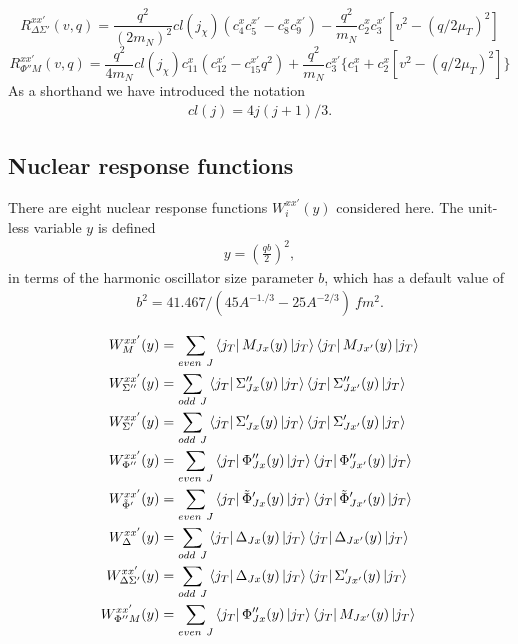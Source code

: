 \documentclass[
14pt, %
a4paper, %
oneside, %
headinclude,footinclude, %
BCOR5mm, %
]{scrartcl}
\begin{document}
\begin{dmath}
R_{\Delta \Sigma'}^{xx'}(v,q) = \frac{q^2}{(2m_N)^2}cl(j_\chi) 
        (c_{4}^{x}c_{5}^{x'} - c_{8}^{x}c_{9}^{x'}) 
        - \frac{q^2}{m_N} c_{2}^{x}c_{3}^{x'} [v^2-(q/2\mu_T)^2]
\end{dmath}
\begin{dmath}
R_{\Phi''M}^{xx'}(v,q) = \frac{q^2}{4m_N}cl(j_\chi)c_{11}^{x}
        (c_{12}^{x'} - c_{15}^{x'} q^2) 
        + \frac{q^2}{m_N}c_{3}^{x'}  \{c_{1}^{x} + c_{2}^{x} [v^2-(q/2\mu_T)^2]\}
\end{dmath}
As a shorthand we have introduced the notation 
\begin{align}
	cl(j) = 4j(j+1)/3.
\end{align}


\subsection{Nuclear response functions}
There are eight nuclear response functions $W_i^{xx'}(y)$ considered 
here. The unit-less variable $y$ is defined 
\begin{align}
 y = \left ( \frac{qb}{2} \right) ^2,
 \end{align}
 in terms of the harmonic oscillator size parameter $b$, which has a default value of 
 \begin{align}\label{bho}
b^2 = 41.467/(45A^{-1./3} - 25A^{-2/3})\ fm^2.
 \end{align}

 
\begin{align}
W_M^{xx'}(y) &= \sum_{even\ J} 
\bra{j_T}M_{Jx}(y)\ket{j_T}
\bra{j_T}M_{Jx'}(y)\ket{j_T}
\\
W_{\Sigma''}^{xx'}(y) &= \sum_{odd\ J} 
\bra{j_T}{\Sigma''}_{Jx}(y)\ket{j_T}
\bra{j_T}{\Sigma''}_{Jx'}(y)\ket{j_T}
\\
W_{\Sigma'}^{xx'}(y) &= \sum_{odd\ J} 
\bra{j_T}{\Sigma'}_{Jx}(y)\ket{j_T}
\bra{j_T}{\Sigma'}_{Jx'}(y)\ket{j_T}
\\
W_{\Phi''}^{xx'}(y) &= \sum_{even\ J} 
\bra{j_T}{\Phi''}_{Jx}(y)\ket{j_T}
\bra{j_T}{\Phi''}_{Jx'}(y)\ket{j_T}
\\
W_{\tilde{\Phi}'}^{xx'}(y) &= \sum_{even\ J} 
\bra{j_T}{\tilde{\Phi}'}_{Jx}(y)\ket{j_T}
\bra{j_T}{\tilde{\Phi}'}_{Jx'}(y)\ket{j_T}
\\
W_{\Delta}^{xx'}(y) &= \sum_{odd\ J} 
\bra{j_T}{\Delta}_{Jx}(y)\ket{j_T}
\bra{j_T}{\Delta}_{Jx'}(y)\ket{j_T}
\\
W_{\Delta\Sigma'}^{xx'}(y) &= \sum_{odd\ J} 
\bra{j_T}{\Delta}_{Jx}(y)\ket{j_T}
\bra{j_T}{\Sigma'}_{Jx'}(y)\ket{j_T}
\\
W_{\Phi''M}^{xx'}(y) &= \sum_{even\ J} 
\bra{j_T}{\Phi''}_{Jx}(y)\ket{j_T}
\bra{j_T}{M}_{Jx'}(y)\ket{j_T}
\end{align}
\end{document}
